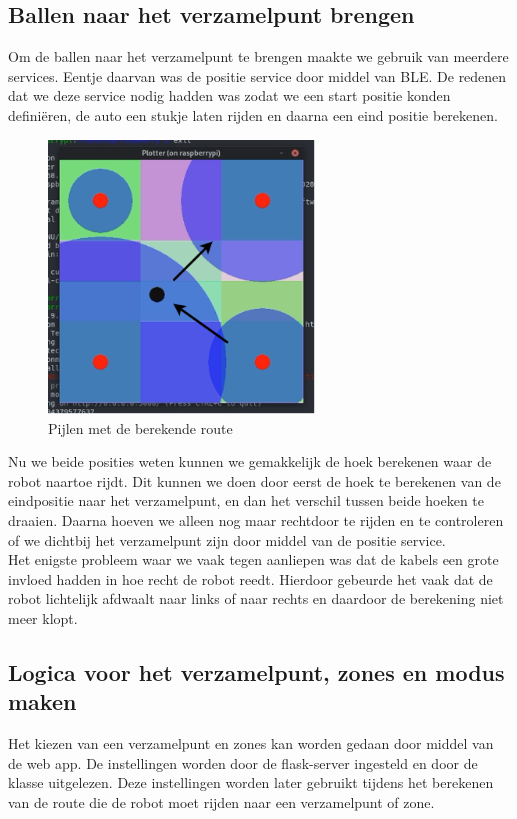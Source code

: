 \subsection{Ballen naar het verzamelpunt brengen}
Om de ballen naar het verzamelpunt te brengen maakte we gebruik van meerdere services. Eentje daarvan was de positie service door middel van BLE. De redenen dat we deze service nodig hadden was zodat we een start positie konden definiëren, de auto een stukje laten rijden en daarna een eind positie berekenen.\\
\begin{figure}[H]
    \centering
    \includegraphics[width=200pt]{img/plotter_angle.png}
    \caption{Pijlen met de berekende route}
    \label{fig:plotter_angle}
\end{figure}

Nu we beide posities weten kunnen we gemakkelijk de hoek berekenen waar de robot naartoe rijdt. Dit kunnen we doen door eerst de hoek te berekenen van de eindpositie naar het verzamelpunt, en dan het verschil tussen beide hoeken te draaien. Daarna hoeven we alleen nog maar rechtdoor te rijden en te controleren of we dichtbij het verzamelpunt zijn door middel van de positie service.\\

Het enigste probleem waar we vaak tegen aanliepen was dat de kabels een grote invloed hadden in hoe recht de robot reedt. Hierdoor gebeurde het vaak dat de robot lichtelijk afdwaalt naar links of naar rechts en daardoor de berekening niet meer klopt.\\

\subsection{Logica voor het verzamelpunt, zones en modus maken}
Het kiezen van een verzamelpunt en zones kan worden gedaan door middel van de web app. De instellingen worden door de flask-server ingesteld en door de  klasse uitgelezen. Deze instellingen worden later gebruikt tijdens het berekenen van de route die de robot moet rijden naar een verzamelpunt of zone.\\

